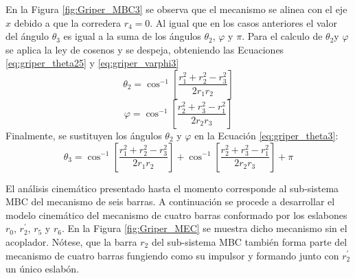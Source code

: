 \begin{enumerate}
En la Figura \ref{fig:Griper_MBC3} se observa que el mecanismo se alinea con el eje $x$ debido a que la corredera $r_4 = 0$. Al igual que en los casos anteriores el valor del ángulo $\theta_3$ es igual a la suma de los ángulos $\theta_2$, $\varphi$ y $\pi$. Para el calculo de $\theta_2$y $\varphi$ se aplica la ley de cosenos y se despeja, obteniendo las Ecuaciones \ref{eq:griper_theta25} y \ref{eq:griper_varphi3}
\begin{equation}\label{eq:griper_theta25}
\theta_2=\cos^{-1}\left[ \frac{r^2_1 +r^2_2-r^2_3}{2r_1r_2}\right]
\end{equation}
\begin{equation}\label{eq:griper_varphi3}
\varphi=\cos^{-1}\left[ \frac{r^2_2 +r^2_3-r^2_1}{2r_2r_3}\right]
\end{equation}
Finalmente, se sustituyen los ángulos $\theta_2$ y $\varphi$  en la Ecuación \ref{eq:griper_theta3}:
\begin{equation}\label{eq:griper_theta33}
\theta_3=\cos^{-1}\left[ \frac{r^2_1 +r^2_2-r^2_3}{2r_1r_2}\right]+\cos^{-1}\left[ \frac{r^2_2 +r^2_3-r^2_1}{2r_2r_3}\right]+\pi
\end{equation}

\end{enumerate}
El análisis cinemático presentado hasta el momento corresponde al sub-sistema MBC del mecanismo de seis barras. A continuación se procede a  desarrollar el modelo cinemático del mecanismo de cuatro barras conformado por los eslabones $r_0$, $r^{\prime}_2$, $r_5$ y $r_6$. En la Figura \ref{fig:Griper_MEC} se muestra dicho mecanismo sin el acoplador. Nótese, que la barra $r_2$ del sub-sistema MBC también forma parte del mecanismo de cuatro barras fungiendo como su impulsor y formando junto con $r^{\prime}_2$ un único eslabón.

